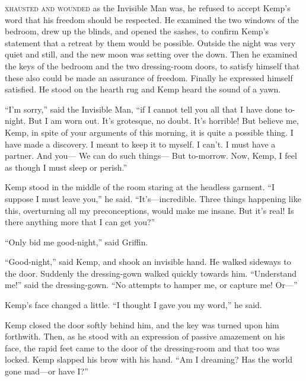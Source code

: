 \label{ch:18}
\begin{ChapterStart}
\vspace*{2\nbs}

\vspace{1.5\nbs}
\vspace{0.75\nbs}
\end{ChapterStart}

\kern-5pt\textsc{xhausted and wounded} as the Invisible Man was, he refused to accept Kemp's word that his freedom should be respected. He examined the two windows of the bedroom, drew up the blinds, and opened the sashes, to confirm Kemp's statement that a retreat by them would be possible. Outside the night was very quiet and still, and the new moon was setting over the down. Then he examined the keys of the bedroom and the two dressing-room doors, to satisfy himself that these also could be made an assurance of freedom. Finally he expressed himself satisfied. He stood on the hearth rug and Kemp heard the sound of a yawn.

“I’m sorry,” said the Invisible Man, “if I cannot tell you all that I have done to-night. But I am worn out. It’s grotesque, no doubt. It’s horrible! But believe me, Kemp, in spite of your arguments of this morning, it is quite a possible thing. I have made a discovery. I meant to keep it to myself. I can’t. I must have a partner. And you— We can do such things— But to-morrow. Now, Kemp, I feel as though I must sleep or perish.”

Kemp stood in the middle of the room staring at the headless garment. “I suppose I must leave you,” he said. “It’s—incredible. Three things happening like this, overturning all my preconceptions, would make me insane. But it’s real! Is there anything more that I can get you?”

“Only bid me good-night,” said Griffin.

“Good-night,” said Kemp, and shook an invisible hand. He walked sideways to the door. Suddenly the dressing-gown walked quickly towards him. “Understand me!” said the dressing-gown. “No attempts to hamper me, or capture me! Or—”

Kemp’s face changed a little. “I thought I gave you my word,” he said.

Kemp closed the door softly behind him, and the key was turned upon him forthwith. Then, as he stood with an expression of passive amazement on his face, the rapid feet came to the door of the dressing-room and that too was locked. Kemp slapped his brow with his hand. “Am I dreaming? Has the world gone mad—or have I?”

